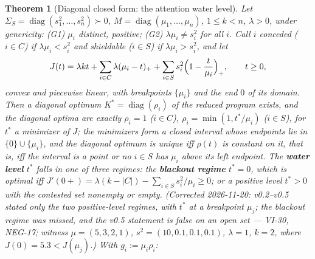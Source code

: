 \documentclass[11pt]{article}
\newtheorem{theorem}{Theorem}
\theoremstyle{definition}
\begin{document}
\begin{theorem}[Diagonal closed form: the attention water level]
\label{thm:diagonal}
Let $\Sigma_S = \operatorname{diag}(s_1^2,\dots,s_n^2)\succ0$,
$M = \operatorname{diag}(\mu_1,\dots,\mu_n)$, $1\le k<n$, $\lambda>0$,
under genericity: (G1) $\mu_i$ distinct, positive; (G2) $\lambda\mu_i \neq
s_i^2$ for all $i$. Call $i$ \emph{conceded} ($i\in C$) if
$\lambda\mu_i<s_i^2$ and \emph{shieldable} ($i\in S$) if
$\lambda\mu_i>s_i^2$, and let
\[
J(t)=\lambda kt+\sum_{i\in C}\lambda(\mu_i-t)_+ +\sum_{i\in S}s_i^2\Bigl(1-\frac t{\mu_i}\Bigr)_+,
\qquad t\ge0,
\]
convex and piecewise linear, with breakpoints $\{\mu_i\}$ and the end
$0$ of its domain.
Then a diagonal optimum $K^\ast=\operatorname{diag}(\rho_i)$ of the
reduced program exists, and the diagonal optima are exactly
$\rho_i=1$ ($i\in C$), $\rho_i=\min(1,t^\ast/\mu_i)$ ($i\in S$), for
$t^\ast$ a minimizer of $J$; the minimizers form a closed interval whose
endpoints lie in $\{0\}\cup\{\mu_i\}$, and the diagonal optimum is unique
iff $\rho(t)$ is constant on it, that is, iff the interval is a point or
no $i\in S$ has $\mu_i$ above its left endpoint. The \textbf{water level} $t^\ast$ falls in
one of three regimes: the \textbf{blackout regime} $t^\ast=0$, which is
optimal iff $J'(0+)=\lambda(k-|C|)-\sum_{i\in S}s_i^2/\mu_i\ge0$; or a
positive level $t^\ast>0$ with the contested set nonempty or empty.
(Corrected 2026-11-20: v0.2--v0.5 stated only the two positive-level
regimes, with $t^\ast$ at a breakpoint $\mu_j$; the blackout regime was
missed, and the v0.5 statement is false on an open set --- VI-30,
NEG-17; witness $\mu=(5,3,2,1)$, $s^2=(10,0.1,0.1,0.1)$, $\lambda=1$,
$k=2$, where $J(0)=5.3<J(\mu_j)$.) With $g_i := \mu_i\rho_i$:
\end{theorem}
\end{document}
